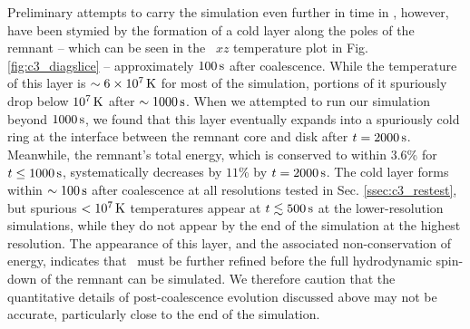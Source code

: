 
Preliminary attempts to carry the simulation even further in time in \arepo, however, have been stymied by the formation of a cold layer along the poles of the remnant -- which can be seen in the \arepo\ $xz$ temperature plot in Fig. \ref{fig:c3_diagslice} -- approximately $100\,\mathrm{s}$ after coalescence.  While the temperature of this layer is $\sim6\times10^7\,\mathrm{K}$ for most of the simulation, portions of it spuriously drop below $10^7\,\mathrm{K}$ after $\sim1000\,\mathrm{s}$.  When we attempted to run our simulation beyond $1000\,\mathrm{s}$, we found that this layer eventually expands into a spuriously cold ring at the interface between the remnant core and disk after $t = 2000\,\mathrm{s}$.  Meanwhile, the remnant's total energy, which is conserved to within $3.6$\% for $t \leq 1000\,\mathrm{s}$, systematically decreases by $11$\% by $t = 2000\,\mathrm{s}$.  The cold layer forms within $\sim100\,\mathrm{s}$ after coalescence at all resolutions tested in Sec. \ref{ssec:c3_restest}, but spurious $<10^7\,\mathrm{K}$ temperatures appear at $t \lesssim500\,\mathrm{s}$ at the lower-resolution simulations, while they do not appear by the end of the simulation at the highest resolution.  The appearance of this layer, and the associated non-conservation of energy, indicates that \arepo\ must be further refined before the full hydrodynamic spin-down of the remnant can be simulated.  We therefore caution that the quantitative details of post-coalescence evolution discussed above may not be accurate, particularly close to the end of the simulation.




